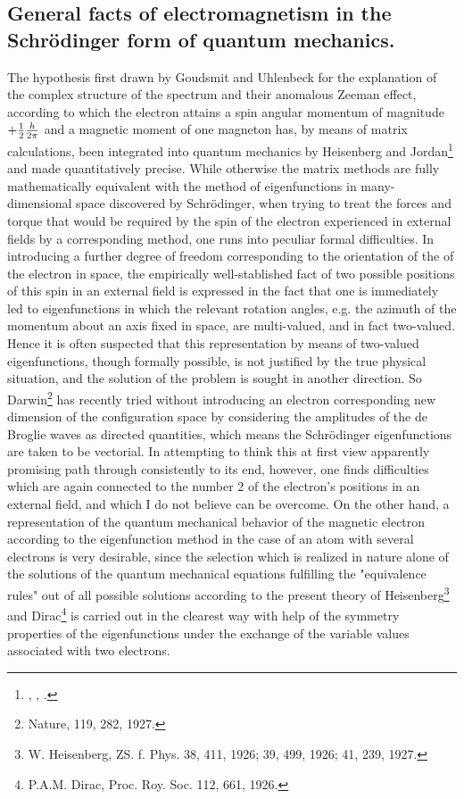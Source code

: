 \begin{paper}{1}
\section{General facts of electromagnetism in the Schr\"odinger form of quantum mechanics.}
The hypothesis first drawn by Goudsmit and Uhlenbeck for the explanation of the complex structure of the spectrum and their anomalous Zeeman effect, according to which the electron attains a spin angular momentum of magnitude $+\frac{1}{2}\frac{h}{2\pi}$ and a magnetic moment of one magneton has, by means of matrix calculations, been integrated into quantum mechanics by Heisenberg and Jordan\footnote{ , , \citeyear{1926}.} and made quantitatively precise. While otherwise the matrix methods are fully mathematically equivalent with the method of eigenfunctions in many-dimensional space discovered by Schr\"odinger, when trying to treat the forces and torque that would be required by the spin of the electron experienced in external fields by a corresponding method, one runs into peculiar formal difficulties. In introducing a further degree of freedom corresponding to the orientation of the  of the electron in space, the empirically well-stablished fact of two possible  positions of this spin in an external field is expressed in the fact that one is immediately led to eigenfunctions in which the relevant rotation angles, e.g. the azimuth of the momentum about an axis fixed in space, are multi-valued, and in fact two-valued. Hence it is often suspected that this representation by means of two-valued eigenfunctions, though formally possible, is not justified by the true physical situation, and the solution of the problem is sought in another direction. So Darwin\footnote{Nature, 119, 282, 1927.} has recently tried  without introducing an electron  corresponding new dimension of the configuration space by considering the amplitudes of the de Broglie waves as directed quantities, which means the Schr\"odinger eigenfunctions are taken to be vectorial. In attempting to think this at first view apparently promising path through consistently to its end, however, one finds difficulties which are again connected to the number 2 of the electron's positions in an external field, and which I do not believe can be overcome. On the other hand, a representation of the quantum mechanical behavior of the magnetic electron according to the eigenfunction method in the case of an atom with several electrons is very desirable, since the selection which is realized in nature alone of the solutions of the quantum mechanical equations fulfilling the "equivalence rules" out of all possible solutions according to the present theory of Heisenberg\footnote{W. Heisenberg, ZS. f. Phys. 38, 411, 1926; 39, 499, 1926; 41, 239, 1927.} and Dirac\footnote{P.A.M. Dirac, Proc. Roy. Soc. 112, 661, 1926.} is carried out in the clearest way with help of the symmetry properties of the eigenfunctions under the exchange of the variable values associated with two electrons.


\end{paper}
